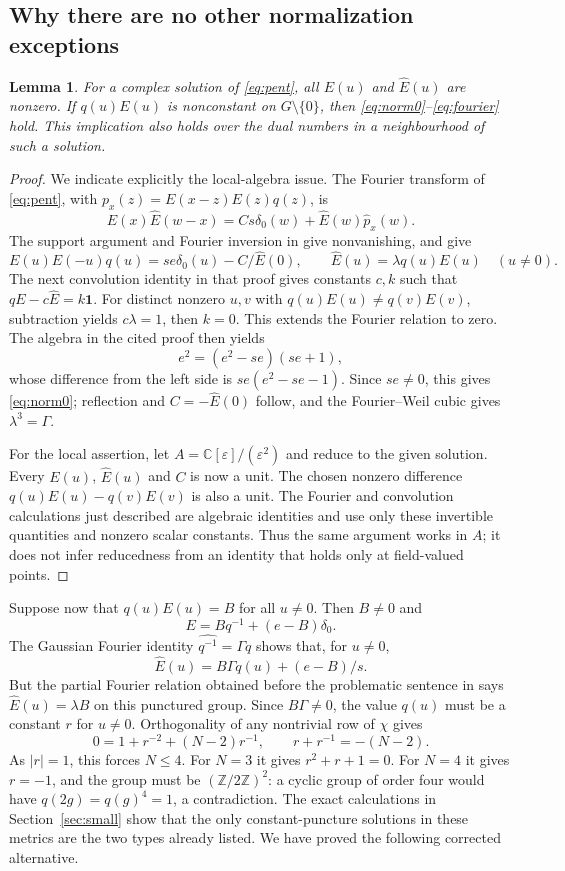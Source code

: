 \documentclass[11pt]{article}
\newtheorem{lemma}[theorem]{Lemma}
\theoremstyle{remark}
\newcommand{\C}{\mathbb C}
\newcommand{\Z}{\mathbb Z}
\newcommand{\eps}{\varepsilon}
\begin{document}
\subsection{Why there are no other normalization exceptions}
\begin{lemma}\label{lem:normal}
For a complex solution of \eqref{eq:pent}, all $E(u)$ and $\widehat E(u)$
are nonzero. If $q(u)E(u)$ is nonconstant on $G\setminus\{0\}$, then
\eqref{eq:norm0}--\eqref{eq:fourier} hold. This implication also holds over
the dual numbers in a neighbourhood of such a solution.
\end{lemma}
\begin{proof}
We indicate explicitly the local-algebra issue. The Fourier transform of
\eqref{eq:pent}, with $p_x(z)=E(x-z)E(z)q(z)$, is
\begin{equation}\label{eq:31}
 E(x)\widehat E(w-x)=Cs\delta_0(w)+\widehat E(w)\widehat p_x(w).
\end{equation}
The support argument and Fourier inversion in
\cite[proof of Theorem 5, (31)--(33)]{RW} give nonvanishing, and give
\[
 E(u)E(-u)q(u)=se\delta_0(u)-C/\widehat E(0),
 \qquad \widehat E(u)=\lambda q(u)E(u)\quad(u\ne0).
\]
The next convolution identity in that proof gives constants $c,k$ such that
$qE-c\widehat E=k\mathbf1$. For distinct nonzero $u,v$ with
$q(u)E(u)\ne q(v)E(v)$, subtraction yields $c\lambda=1$, then $k=0$.
This extends the Fourier relation to zero. The algebra in the cited proof
then yields
\[
 e^2=(e^2-se)(se+1),
\]
whose difference from the left side is $se(e^2-se-1)$.
Since $se\ne0$, this gives \eqref{eq:norm0}; reflection and $C=-\widehat E(0)$
follow, and the Fourier--Weil cubic gives $\lambda^3=\Gamma$.

For the local assertion, let $A=\C[\eps]/(\eps^2)$ and reduce to the given
solution. Every $E(u)$, $\widehat E(u)$ and $C$ is now a unit. The chosen
nonzero difference $q(u)E(u)-q(v)E(v)$ is also a unit. The Fourier and
convolution calculations just described are algebraic identities and use only
these invertible quantities and nonzero scalar constants. Thus the same
argument works in $A$; it does not infer reducedness from an identity that
holds only at field-valued points.
\end{proof}

Suppose now that $q(u)E(u)=B$ for all $u\ne0$. Then $B\ne0$ and
\[
 E=Bq^{-1}+(e-B)\delta_0.
\]
The Gaussian Fourier identity $\widehat{q^{-1}}=\Gamma q$ shows that, for
$u\ne0$,
\[
 \widehat E(u)=B\Gamma q(u)+(e-B)/s.
\]
But the partial Fourier relation obtained before the problematic sentence in
\cite{RW} says $\widehat E(u)=\lambda B$ on this punctured group.
Since $B\Gamma\ne0$, the value $q(u)$ must be a constant $r$ for $u\ne0$.
Orthogonality of any nontrivial row of $\chi$ gives
\[
 0=1+r^{-2}+(N-2)r^{-1},\qquad r+r^{-1}=-(N-2).
\]
As $|r|=1$, this forces $N\le4$. For $N=3$ it gives $r^2+r+1=0$.
For $N=4$ it gives $r=-1$, and the group must be $(\Z/2\Z)^2$:
a cyclic group of order four would have $q(2g)=q(g)^4=1$, a contradiction.
The exact calculations in Section~\ref{sec:small} show that the only
constant-puncture solutions in these metrics are the two types already
listed. We have proved the following corrected alternative.
\end{document}
